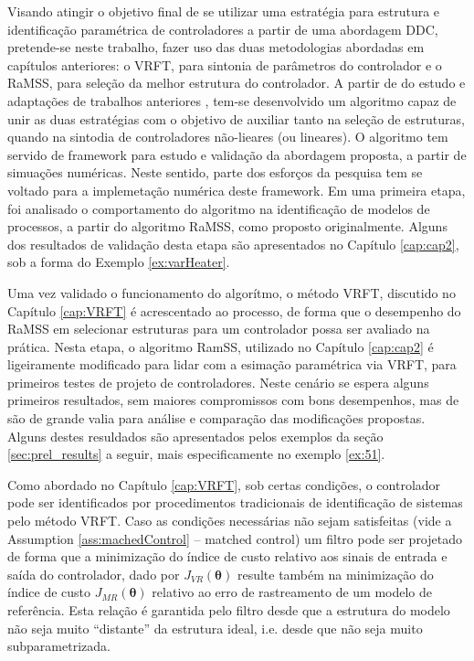 Visando atingir o objetivo final de se utilizar uma estratégia para estrutura e identificação paramétrica de controladores a partir de uma abordagem DDC, pretende-se neste trabalho, fazer uso das duas metodologias abordadas em capítulos anteriores: o VRFT, para sintonia de parâmetros do controlador e o RaMSS, para seleção da melhor estrutura do controlador. A partir de do estudo e adaptações de trabalhos anteriores \citep{retesNARMAXModelIdentification2019}, tem-se desenvolvido um algoritmo capaz de unir as duas estratégias com o objetivo de auxiliar tanto na seleção de estruturas, quando na sintodia de controladores não-lieares (ou lineares). O algoritmo tem servido de  framework para estudo e validação da abordagem proposta, a partir de simuações numéricas. Neste sentido, parte dos esforços da pesquisa tem se voltado para a implemetação numérica deste framework. Em uma primeira etapa, foi analisado o comportamento do algoritmo na identificação de modelos de processos, a partir do algoritmo RaMSS, como proposto originalmente. Alguns dos resultados de validação desta etapa são apresentados no Capítulo \ref{cap:cap2}, sob a forma do Exemplo \ref{ex:varHeater}.

Uma vez validado o funcionamento do algorítmo, o método VRFT, discutido no Capítulo \ref{cap:VRFT} é acrescentado ao processo, de forma que o desempenho do RaMSS em selecionar estruturas para um controlador possa ser avaliado na prática.
Nesta etapa, o algoritmo RamSS, utilizado no Capítulo \ref{cap:cap2} é ligeiramente modificado para lidar com a esimação paramétrica via VRFT, para primeiros testes de projeto de controladores. Neste cenário se espera alguns primeiros resultados, sem maiores compromissos com bons desempenhos, mas de são de grande valia para análise e comparação das modificações propostas. Alguns destes resuldados são apresentados pelos exemplos da seção \ref{sec:prel_results} a seguir, mais especificamente no exemplo \ref{ex:51}.

Como abordado no Capítulo \ref{cap:VRFT}, sob certas condições, o controlador pode ser identificados por procedimentos tradicionais de identificação de sistemas pelo método VRFT. Caso as condições necessárias não sejam satisfeitas (vide a Assumption \ref{ass:machedControl} -- matched control) um filtro pode ser projetado de forma que a minimização do índice de custo relativo aos sinais de entrada e saída do controlador, dado por $J_{VR}(\bm{\theta})$ resulte também na minimização do índice de custo $J_{MR}(\bm{\theta})$ relativo ao erro de rastreamento de um modelo de referência. Esta relação é garantida pelo filtro desde que a estrutura do modelo não seja muito ``distante'' da estrutura ideal, i.e. desde que não seja muito subparametrizada.

